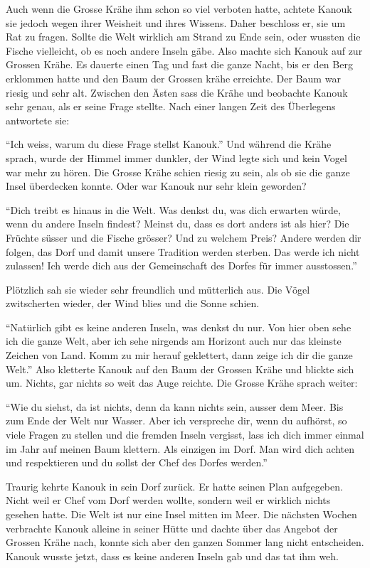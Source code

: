 Auch wenn die Grosse Krähe ihm schon so viel verboten hatte, achtete Kanouk sie jedoch wegen ihrer Weisheit und ihres Wissens. Daher beschloss er, sie um Rat zu fragen. Sollte die Welt wirklich am Strand zu Ende sein, oder wussten die Fische vielleicht, ob es noch andere Inseln gäbe. Also machte sich Kanouk auf zur Grossen Krähe. Es dauerte einen Tag und fast die ganze Nacht, bis er den Berg erklommen hatte und den Baum der Grossen krähe erreichte. Der Baum war riesig und sehr alt. Zwischen den Ästen sass die Krähe und beobachte Kanouk sehr genau, als er seine Frage stellte. Nach einer langen Zeit des Überlegens antwortete sie:

\enquote{Ich weiss, warum du diese Frage stellst Kanouk.} Und während die Krähe sprach, wurde der Himmel immer dunkler, der Wind legte sich und kein Vogel war mehr zu hören. Die Grosse Krähe schien riesig zu sein, als ob sie die ganze Insel überdecken konnte. Oder war Kanouk nur sehr klein geworden? 

\enquote{Dich treibt es hinaus in die Welt. Was denkst du, was dich erwarten würde, wenn du andere Inseln findest? Meinst du, dass es dort anders ist als hier? Die Früchte süsser und die Fische grösser? Und zu welchem Preis? Andere werden dir folgen, das Dorf und damit unsere Tradition werden sterben. Das werde ich nicht zulassen! Ich werde dich aus der Gemeinschaft des Dorfes für immer ausstossen.} 

Plötzlich sah sie wieder sehr freundlich und mütterlich aus. Die Vögel zwitscherten wieder, der Wind blies und die Sonne schien.

\enquote{Natürlich gibt es keine anderen Inseln, was denkst du nur. Von hier oben sehe ich die ganze Welt, aber ich sehe nirgends am Horizont auch nur das kleinste Zeichen von Land. Komm zu mir herauf geklettert, dann zeige ich dir die ganze Welt.} Also kletterte Kanouk auf den Baum der Grossen Krähe und blickte sich um. Nichts, gar nichts so weit das Auge reichte. Die Grosse Krähe sprach weiter:

\enquote{Wie du siehst, da ist nichts, denn da kann nichts sein, ausser dem Meer. Bis zum Ende der Welt nur Wasser. Aber ich verspreche dir, wenn du aufhörst, so viele Fragen zu stellen und die fremden Inseln vergisst, lass ich dich immer einmal im Jahr auf meinen Baum klettern. Als einzigen im Dorf. Man wird dich achten und respektieren und du sollst der Chef des Dorfes werden.}

Traurig kehrte Kanouk in sein Dorf zurück. Er hatte seinen Plan aufgegeben. Nicht weil er Chef vom Dorf werden wollte, sondern weil er wirklich nichts gesehen hatte. Die Welt ist nur eine Insel mitten im Meer. Die nächsten Wochen verbrachte Kanouk alleine in seiner Hütte und dachte über das Angebot der Grossen Krähe nach, konnte sich aber den ganzen Sommer lang nicht entscheiden. Kanouk wusste jetzt, dass es keine anderen Inseln gab und das tat ihm weh.

